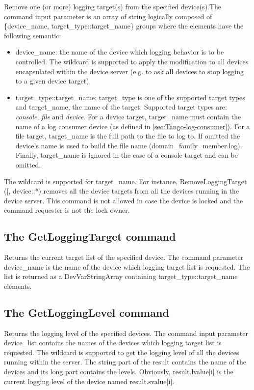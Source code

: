 Remove one (or more) logging target(s) from the specified device(s).The
command input parameter is an array of string logically composed of
\{device\_name, target\_type::target\_name\} groups where the elements
have the following semantic:
\begin{itemize}
\item device\_name: the name of the device which logging behavior is to
be controlled. The wildcard \textquotedbl{}{*}\textquotedbl{} is supported
to apply the modification to all devices encapsulated within the device
server (e.g. to ask all devices to stop logging to a given device
target).
\item target\_type::target\_name: target\_type is one of the supported target
types and target\_name, the name of the target. Supported target types
are: \emph{console}, \emph{file} and \emph{device}. For a device target,
target\_name must contain the name of a log consumer device (as defined
in \ref{sec:Tango-log-consumer}). For a file target, target\_name
is the full path to the file to log to. If omitted the device's name
is used to build the file name (domain\_family\_member.log). Finally,
target\_name is ignored in the case of a console target and can be
omitted.
\end{itemize}
The wildcard \textquotedbl{}{*}\textquotedbl{} is supported for target\_name.
For instance, RemoveLoggingTarget ({[}\textquotedbl{}{*}\textquotedbl{},
\textquotedbl{}device::{*}\textquotedbl{}{]}) removes all the device
targets from all the devices running in the device server. This command
is not allowed in case the device is locked and the command requester
is not the lock owner.


\subsection{The GetLoggingTarget command}

Returns the current target list of the specified device. The command
parameter device\_name is the name of the device which logging target
list is requested. The list is returned as a DevVarStringArray containing
target\_type::target\_name elements.


\subsection{The GetLoggingLevel command}

Returns the logging level of the specified devices. The command input
parameter device\_list contains the names of the devices which logging
target list is requested. The wildcard \textquotedbl{}{*}\textquotedbl{}
is supported to get the logging level of all the devices running within
the server. The string part of the result contains the name of the
devices and its long part contains the levels. Obviously, result.lvalue{[}i{]}
is the current logging level of the device named result.svalue{[}i{]}.



